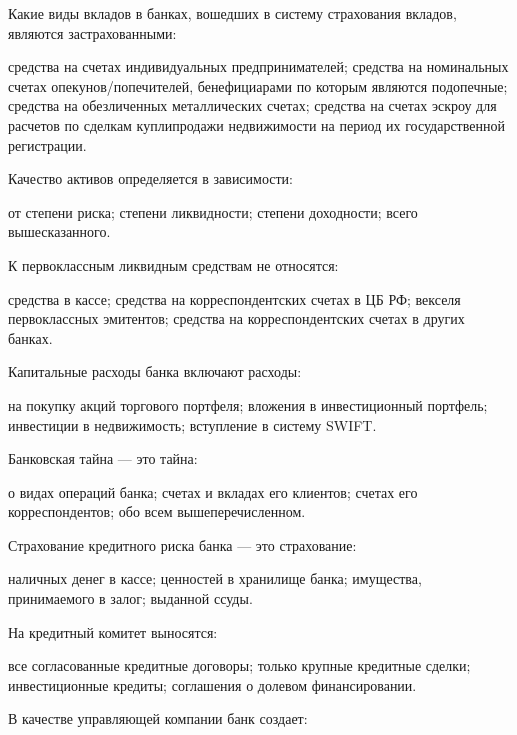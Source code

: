 \documentclass[12pt, table]{exam}
\begin{document}
\begin{questions}
\begin{multicols}{2}
\begin{choices}
	 \end{choices}
\question Какие виды вкладов в банках, вошедших в систему страхования вкладов, являются застрахованными:
	 \begin{choices}
	 \choice средства на счетах индивидуальных предпринимателей;
	 \choice средства на номинальных счетах опекунов/попечителей, бенефициарами по которым являются подопечные;
	 \CC средства на обезличенных металлических счетах;
	 \choice средства на счетах эскроу для расчетов по сделкам куплипродажи недвижимости на период их государственной регистрации.
	 \end{choices}
\question Качество активов определяется в зависимости:
	 \begin{choices}
	 \choice от степени риска;
	 \choice степени ликвидности;
	 \choice степени доходности;
	 \CC всего вышесказанного.
	 \end{choices}
\question К первоклассным ликвидным средствам не относятся:
	 \begin{choices}
	 \choice средства в кассе;
	 \choice средства на корреспондентских счетах в ЦБ РФ;
	 \CC векселя первоклассных эмитентов;
	 \choice средства на корреспондентских счетах в других банках.
	 \end{choices}
\question Капитальные расходы банка включают расходы:
	 \begin{choices}
	 \choice на покупку акций торгового портфеля;
	 \choice вложения в инвестиционный портфель;
	 \choice инвестиции в недвижимость;
	 \CC вступление в систему SWIFT.
	 \end{choices}
\question Банковская тайна — это тайна:
	 \begin{choices}
	 \CC о видах операций банка;
	 \choice счетах и вкладах его клиентов;
	 \choice счетах его корреспондентов;
	 \choice обо всем вышеперечисленном.
	 \end{choices}
\question Страхование кредитного риска банка — это страхование:
	 \begin{choices}
	 \choice наличных денег в кассе;
	 \choice ценностей в хранилище банка;
	 \CC имущества, принимаемого в залог;
	 \choice выданной ссуды.
	 \end{choices}
\question На кредитный комитет выносятся:
	 \begin{choices}
	 \CC все согласованные кредитные договоры;
	 \choice только крупные кредитные сделки;
	 \choice инвестиционные кредиты;
	 \choice соглашения о долевом финансировании.
	 \end{choices}
\question В качестве управляющей компании банк создает:

\end{multicols}
\end{questions}
\end{document}
